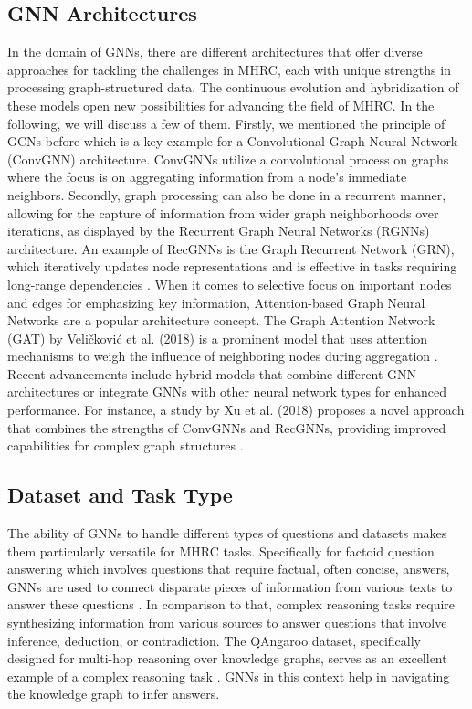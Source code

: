 \documentclass[sigplan,screen,nonacm]{acmart}
\begin{document}
\subsection{GNN Architectures}
In the domain of GNNs, there are different architectures that offer diverse approaches for tackling the challenges in MHRC, each with unique strengths
in processing graph-structured data. The continuous evolution and hybridization of these models open new possibilities for advancing the field of MHRC. In
the following, we will discuss a few of them. Firstly, we mentioned the principle of GCNs before which is a key example for a Convolutional Graph 
Neural Network (ConvGNN) architecture. ConvGNNs utilize a convolutional process on graphs where the focus is on aggregating information from a node's 
immediate neighbors. Secondly, graph processing can also be done in a recurrent manner, allowing for the capture of information from wider graph 
neighborhoods over iterations, as displayed by the Recurrent Graph Neural Networks (RGNNs) architecture. An example of RecGNNs is the Graph Recurrent
Network (GRN), which iteratively updates node representations and is effective in tasks requiring long-range dependencies \cite{RN211}. When it comes to
selective focus on important nodes and edges for emphasizing key information, Attention-based Graph Neural Networks are a popular architecture concept. 
The Graph Attention Network (GAT) by Veličković et al. (2018) is a prominent model that uses attention mechanisms to weigh the influence of neighboring
nodes during aggregation \cite{RN7}. Recent advancements include hybrid models that combine different GNN architectures or integrate GNNs with other neural
network types for enhanced performance. For instance, a study by Xu et al. (2018) proposes a novel approach that combines the strengths of ConvGNNs 
and RecGNNs, providing improved capabilities for complex graph structures \cite{RN15}.

\subsection{Dataset and Task Type}
The ability of GNNs to handle different types of questions and datasets makes them particularly versatile for MHRC tasks. Specifically for factoid question
answering which involves questions that require factual, often concise, answers, GNNs are used to connect disparate pieces of information from various texts
to answer these questions \cite{RN116}. In comparison to that, complex reasoning tasks require synthesizing information from various sources to answer 
questions that involve inference, deduction, or contradiction. The QAngaroo dataset, specifically designed for multi-hop reasoning over knowledge graphs, 
serves as an excellent example of a complex reasoning task \cite{RN115}. GNNs in this context help in navigating the knowledge graph to infer answers.
\end{document}
